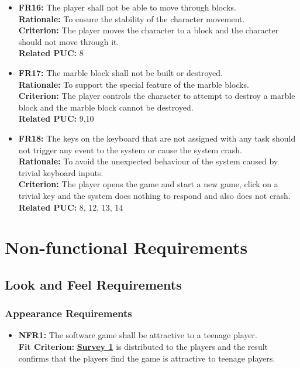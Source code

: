 \documentclass[12pt, titlepage]{article}
\begin{document}
\begin{itemize}
        \item \textbf{FR16:} The player shall not be able to move through blocks.\\
        \textbf{Rationale:} To ensure the stability of the character movement.\\
        \textbf{Criterion:} The player moves the character to a block and the character should not move through it.\\
        \textbf{Related PUC:} 8
        
        \item \textbf{FR17:} The marble block shall not be built or destroyed.\\
        \textbf{Rationale:} To support the special feature of the marble blocks.\\
        \textbf{Criterion:} The player controls the character to attempt to destroy a marble block and the marble block cannot be destroyed.\\
        \textbf{Related PUC:} 9,10
        
        \item \textbf{FR18:} The keys on the keyboard that are not assigned with any task should not trigger any event to the system or cause the system crash.\\
        \textbf{Rationale:} To avoid the unexpected behaviour of the system caused by trivial keyboard inputs.\\
        \textbf{Criterion:} The player opens the game and start a new game, click on a trivial key and the system does nothing to respond and also does not crash.\\
        \textbf{Related PUC:} 8, 12, 13, 14
\end{itemize}
\section{Non-functional Requirements}

\subsection{Look and Feel Requirements}
\subsubsection{Appearance Requirements}
\begin{itemize}
        \item \textbf{NFR1:} The software game shall be attractive to a teenage player.\\
                    \textbf{Fit Criterion:} \hyperref[s1]{\textbf{Survey 1}} is distributed to the players and the result confirms that the players find the game is attractive to teenage players.
\end{itemize}
\end{document}
